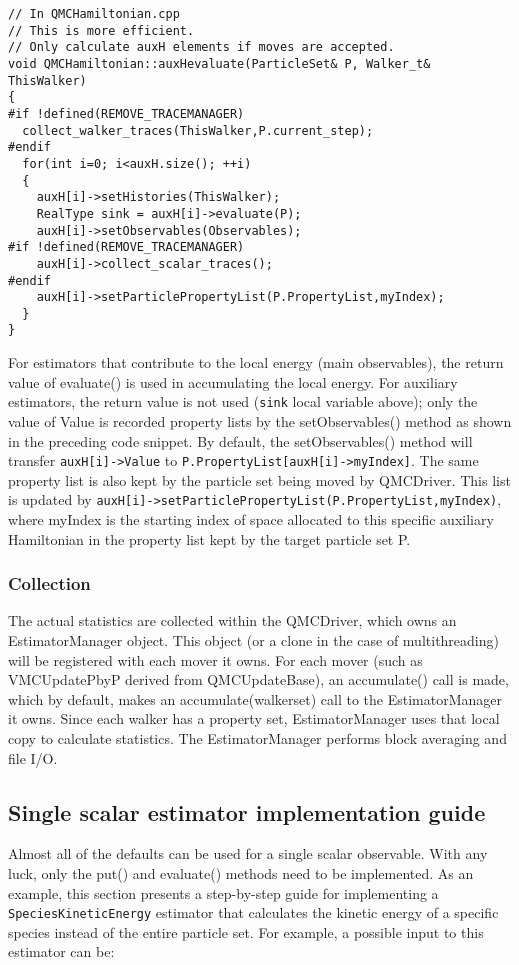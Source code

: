 \begin{lstlisting}[style=C++]
// In QMCHamiltonian.cpp
// This is more efficient. 
// Only calculate auxH elements if moves are accepted.
void QMCHamiltonian::auxHevaluate(ParticleSet& P, Walker_t& ThisWalker)
{
#if !defined(REMOVE_TRACEMANAGER)
  collect_walker_traces(ThisWalker,P.current_step);
#endif
  for(int i=0; i<auxH.size(); ++i)
  {
    auxH[i]->setHistories(ThisWalker);
    RealType sink = auxH[i]->evaluate(P);
    auxH[i]->setObservables(Observables);
#if !defined(REMOVE_TRACEMANAGER)
    auxH[i]->collect_scalar_traces();
#endif
    auxH[i]->setParticlePropertyList(P.PropertyList,myIndex);
  }
}
\end{lstlisting}

For estimators that contribute to the local energy (main observables), the return value of evaluate() is used in accumulating the local energy. For auxiliary estimators, the return value is not used (\verb|sink| local variable above); only the value of Value is recorded property lists by the setObservables() method as shown in the preceding code snippet. By default, the setObservables() method will transfer \verb|auxH[i]->Value| to \verb|P.PropertyList[auxH[i]->myIndex]|. The same property list is also kept by the particle set being moved by QMCDriver. This list is updated by \verb|auxH[i]->setParticlePropertyList(P.PropertyList,myIndex)|, where myIndex is the starting index of space allocated to this specific auxiliary Hamiltonian in the property list kept by the target particle set P.

\subsubsection{Collection}
The actual statistics are collected within the QMCDriver, which owns
an EstimatorManager object. This object (or a clone in the case of
multithreading) will be registered with each mover it owns. For each mover
(such as VMCUpdatePbyP derived from QMCUpdateBase), an accumulate() call
is made, which by default, makes an accumulate(walkerset) call to the
EstimatorManager it owns. Since each walker has a property set, EstimatorManager uses that local copy to calculate statistics. The EstimatorManager performs block averaging and file I/O.

\subsection{Single scalar estimator implementation guide}
Almost all of the defaults can be used for a single scalar observable. With any luck, only the put() and evaluate() methods need to be implemented. As an example, this section presents a step-by-step guide for implementing a \verb|SpeciesKineticEnergy| estimator that calculates the kinetic energy of a specific species instead of the entire particle set. For example, a possible input to this estimator can be:

